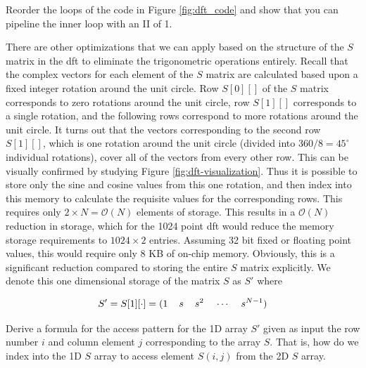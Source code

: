 \begin{exercise}
Reorder the loops of the code in Figure \ref{fig:dft_code} and show that you can pipeline the inner loop with an II of 1.
\end{exercise}

There are other optimizations that we can apply based on the structure of the $S$ matrix in the \gls{dft} to eliminate the trigonometric operations entirely.  Recall that the complex vectors for each element of the $S$ matrix are calculated based upon a fixed integer rotation around the unit circle.  Row $S[0][]$ of the $S$ matrix corresponds to zero rotations around the unit circle, row $S[1][]$ corresponds to a single rotation, and the following rows correspond to more rotations around the unit circle. It turns out that the vectors corresponding to the second row $S[1][]$, which is one rotation around the unit circle (divided into $360/8 = 45^{\circ}$ individual rotations), cover all of the vectors from every other row.  This can be visually confirmed by studying Figure \ref{fig:dft-visualization}.   Thus it is possible to store only the sine and cosine values from this one rotation, and then index into this memory to calculate the requisite values for the corresponding rows. This requires only $2 \times N = \mathcal{O}(N)$ elements of storage. This results in a $\mathcal{O}(N)$ reduction in storage, which for the 1024 point \gls{dft} would reduce the memory storage requirements to $1024 \times 2$ entries. Assuming 32 bit fixed or floating point values, this would require only 8 KB of on-chip memory. Obviously, this is a significant reduction compared to storing the entire $S$ matrix explicitly.   We denote this one dimensional storage of the matrix $S$ as $S'$ where

\begin{equation}
\label{eq:1DS}
S' = S[1][\cdot] = (1 \hspace{4mm} s \hspace{4mm} s^2 \hspace{4mm} \cdots \hspace{4mm} s^{N-1})
\end{equation}

\begin{exercise}
Derive a formula for the access pattern for the 1D array $S'$ given as input the row number $i$ and column element $j$ corresponding to the array $S$. That is, how do we index into the 1D $S$ array to access element $S(i,j)$ from the 2D $S$ array.
\end{exercise}

